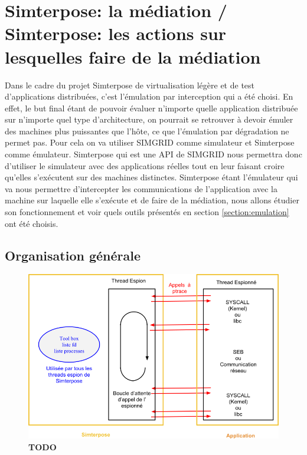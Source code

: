 
\section{Simterpose: la médiation / Simterpose: les actions sur lesquelles faire de la médiation}
\label{section:simterpose}
Dans le cadre du projet Simterpose de virtualisation légère et de test
d'applications distribuées, c'est l'émulation par interception qui a été
choisi. En effet, le but final étant de pouvoir évaluer n'importe quelle
application distribuée sur n'importe quel type d'architecture, on pourrait se
retrouver à devoir émuler des machines plus puissantes que l'hôte, ce que
l'émulation par dégradation ne permet pas. Pour cela on va utiliser SIMGRID
comme simulateur et Simterpose comme émulateur. Simterpose qui est une API de
SIMGRID nous permettra donc d'utiliser le simulateur avec des applications
réelles tout en leur faisant croire qu'elles s'exécutent sur des machines
distinctes. Simterpose étant l'émulateur qui va nous permettre d'intercepter les
communications de l'application avec la machine sur laquelle elle s'exécute et
de faire de la médiation, nous allons étudier son fonctionnement et voir quels
outils présentés en section \ref{section:emulation} ont été choisis.

\subsection{Organisation générale}
\begin{figure}[H]
  \centering
  \includegraphics[scale=0.50]{Pictures/png/Organisation_generale_code_Simterpose_v2.png}
  \caption{{\color{red} \textbf{TODO}}}
  \label{Organisation_Simterpose}
\end{figure}

